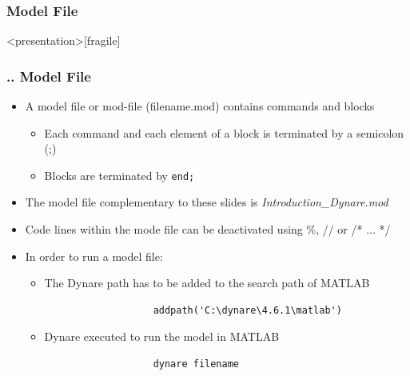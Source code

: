 \documentclass[11pt,aspectratio=169]{beamer}
\begin{document}
\subsubsection{Model File}
\begin{frame}<presentation>[fragile]
	\frametitle{{\thesection.\thesubsection.\thesubsubsection} Model File}
	\begin{itemize}
		\item A model file or mod-file (filename.mod) contains commands and blocks 
		\begin{itemize}
			\item Each command and each element of a block is terminated by a semicolon (;)
			\item Blocks are terminated by \texttt{end;} 
		\end{itemize}
		\item The model file complementary to these slides is \textit{Introduction\_Dynare.mod}
		\item Code lines within the mode file can be deactivated using \%, // or /* ... */
		\item In order to run a model file:
		\begin{itemize}
			\item The Dynare path has to be added to the search path of MATLAB
				\begin{verbatim}
				   addpath('C:\dynare\4.6.1\matlab')
				\end{verbatim}
			\item Dynare executed to run the model in MATLAB
				\begin{verbatim}
				   dynare filename
				\end{verbatim}
		\end{itemize} 
	\end{itemize}
\end{frame}
\end{document}

